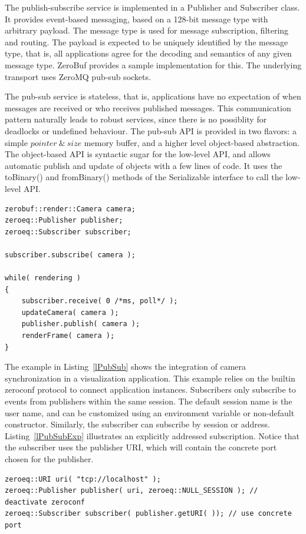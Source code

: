 \documentclass[10pt]{llncs}
\newcommand{\lref}[1]{Listing~\ref{#1}}
\begin{document}
The publish-subscribe service is implemented in a \textsf{Publisher} and
\textsf{Subscriber} class. It provides event-based messaging, based on a 128-bit
message type with arbitrary payload. The message type is used for message
subscription, filtering and routing. The payload is expected to be uniquely
identified by the message type, that is, all applications agree for the decoding
and semantics of any given message type. ZeroBuf provides a sample
implementation for this. The underlying transport uses ZeroMQ pub-sub sockets.

The pub-sub service is stateless, that is, applications have no expectation of
when messages are received or who receives published messages. This
communication pattern naturally leads to robust services, since there is no
possiblity for deadlocks or undefined behaviour. The pub-sub API is provided in
two flavors: a simple $pointer\ \&\ size$ memory buffer, and a higher level
object-based abstraction. The object-based API is syntactic sugar for the
low-level API, and allows automatic publish and update of objects with a few
lines of code. It uses the \textsf{toBinary()} and \textsf{fromBinary()} methods
of the \textsf{Serializable} interface to call the low-level API.

\begin{lstlisting}[float, caption=Publish-Subscribe Example, label=lPubSub]
zerobuf::render::Camera camera;
zeroeq::Publisher publisher;
zeroeq::Subscriber subscriber;

subscriber.subscribe( camera );

while( rendering )
{
    subscriber.receive( 0 /*ms, poll*/ );
    updateCamera( camera );
    publisher.publish( camera );
    renderFrame( camera );
}
\end{lstlisting}

The example in \lref{lPubSub} shows the integration of camera
synchronization in a visualization application. This example relies on the
builtin zeroconf protocol to connect application instances. Subscribers only
subscribe to events from publishers within the same session. The default
session name is the user name, and can be customized using an environment
variable or non-default constructor. Similarly, the subscriber can subscribe by
session or address. \lref{lPubSubExp} illustrates an explicitly addressed
subscription. Notice that the subscriber uses the publisher URI, which will
contain the concrete port chosen for the publisher.

\begin{lstlisting}[float, caption=Explicit Addressing,label=lPubSubExp]
zeroeq::URI uri( "tcp://localhost" );
zeroeq::Publisher publisher( uri, zeroeq::NULL_SESSION ); // deactivate zeroconf
zeroeq::Subscriber subscriber( publisher.getURI( )); // use concrete port
\end{lstlisting}
\end{document}
